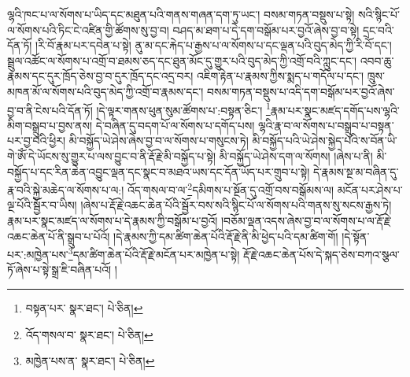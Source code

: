 ལྷའི་ཁང་པ་ལ་སོགས་པ་ཡིད་དང་མཐུན་པའི་གནས་གཞན་དག་ཏུ་ཡང་། བསམ་གཏན་བསྡུས་པ་སྟེ། སའི་སྙིང་པོ་ལ་སོགས་པའི་ཏིང་ངེ་འཛིན་གྱི་ཚོགས་སུ་བྱ་བ། བཤད་མ་ཐག་པ་དེ་དག་བསྒོམ་པར་བྱའོ་ཞེས་བྱ་བ་སྟེ། དྲང་བའི་དོན་ཏོ། །རི་བོ་རྣམ་པར་དབེན་པ་སྟེ། ནུ་མ་དང་རྐེད་པ་རྒྱས་པ་ལ་སོགས་པ་དང་ལྡན་པའི་བུད་མེད་ཀྱི་རི་བོ་དང་། སྦྲུལ་འཚོང་ལ་སོགས་པ་འགྲོ་བ་ཐམས་ཅད་དང་ཐུན་མོང་དུ་གྱུར་པའི་བུད་མེད་ཀྱི་འགྲོ་བའི་ཀླུང་དང་། འབབ་ཆུ་རྣམས་དང་དུར་ཁྲོད་ཅེས་བྱ་བ་དུར་ཁྲོད་དང་འདྲ་བར། འཇིག་རྟེན་པ་རྣམས་ཀྱིས་སྨད་པ་གདོལ་པ་དང་། ཁྲུས་མཁན་མོ་ལ་སོགས་པའི་བུད་མེད་ཀྱི་འགྲོ་བ་རྣམས་དང་། བསམ་གཏན་བསྡུས་པ་འདི་དག་བསྒོམ་པར་བྱའོ་ཞེས་བྱ་བ་ནི་ངེས་པའི་དོན་ཏོ། །དེ་ལྟར་གནས་ཕུན་སུམ་ཚོགས་པ་:བསྟན་ཅིང་། \footnote{བསྟན་པར་  སྣར་ཐང་།  པེ་ཅིན། }རྣམ་པར་སྣང་མཛད་དགོད་པས་ལྷའི་མིག་བསྒྲུབ་པ་བྱས་ནས། དེ་བཞིན་དུ་བདག་པོ་ལ་སོགས་པ་དགོད་པས། ལྷའི་རྣ་བ་ལ་སོགས་པ་བསྒྲུབ་པ་བསྟན་པར་བྱ་བའི་ཕྱིར། མི་བསྐྱོད་ཡེ་ཤེས་ཞེས་བྱ་བ་ལ་སོགས་པ་གསུངས་ཏེ། མི་བསྐྱོད་པའི་ཡེ་ཤེས་སྐྱེད་པའི་ས་བོན་ཡི་གེ་ཨོཾ་དེ་ཡོངས་སུ་གྱུར་པ་ལས་བྱུང་བ་ནི་རྡོ་རྗེ་མི་བསྐྱོད་པ་སྟེ། མི་བསྐྱོད་ཡེ་ཤེས་དག་ལ་སོགས། །ཞེས་པ་ནི། མི་བསྐྱོད་པ་དང་རིན་ཆེན་འབྱུང་ལྡན་དང་སྣང་བ་མཐའ་ཡས་དང་དོན་ཡོད་པར་གྲུབ་པ་སྟེ། དེ་རྣམས་སྔ་མ་བཞིན་དུ་རྣ་བའི་སྐྱེ་མཆེད་ལ་སོགས་པ་ལ:། འོད་གསལ་བ་ལ་\footnote{འོད་གསལ་བ་  སྣར་ཐང་།  པེ་ཅིན། }དམིགས་པ་སྔོན་དུ་འགྲོ་བས་བསྒོམས་ལ། མངོན་པར་ཤེས་པ་ལྔ་པོའི་སྦྱོར་བ་ཡིས། །ཞེས་པ་རྡོ་རྗེ་འཆང་ཆེན་པོའི་སྦྱོར་བས་སའི་སྙིང་པོ་ལ་སོགས་པའི་གནས་སུ་སངས་རྒྱས་ཏེ། རྣམ་པར་སྣང་མཛད་ལ་སོགས་པ་དེ་རྣམས་ཀྱི་བསྒོམ་པ་བྱའོ། །བཅོམ་ལྡན་འདས་ཞེས་བྱ་བ་ལ་སོགས་པ་ལ་རྡོ་རྗེ་འཆང་ཆེན་པོ་ནི་སྒྲུབ་པ་པོའོ། །དེ་རྣམས་ཀྱི་དམ་ཚིག་ཆེན་པོའི་རྡོ་རྗེ་ནི་མི་ཕྱེད་པའི་དམ་ཚིག་གོ། །དེ་སྟོན་པར་:མཁྱེན་པས་\footnote{མཁྱེན་པས་ན་  སྣར་ཐང་།  པེ་ཅིན། }དམ་ཚིག་ཆེན་པོའི་རྡོ་རྗེ་མངོན་པར་མཁྱེན་པ་སྟེ། རྡོ་རྗེ་འཆང་ཆེན་པོས་དེ་སྐད་ཅེས་བཀའ་སྩལ་ཏོ་ཞེས་པ་སྟེ་སྒྲ་ཇི་བཞིན་པའོ། །
